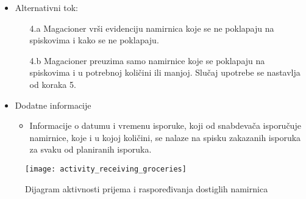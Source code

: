 \begin{itemize}
		\item{Alternativni tok:}
			\begin{enumerate}
				\item[4.a] {Magacioner vrši evidenciju namirnica koje se ne poklapaju na spiskovima i kako se ne poklapaju.} 
				\item[4.b]{Magacioner preuzima samo namirnice koje se poklapaju na spiskovima i u potrebnoj količini ili manjoj. Slučaj upotrebe se nastavlja od koraka 5.}
			\end{enumerate}
		\item{Dodatne informacije}
			\begin{itemize}
				\item{Informacije o datumu i vremenu isporuke, koji od snabdevača isporučuje namirnice, koje i u kojoj količini, se nalaze na spisku zakazanih isporuka za svaku od planiranih isporuka.}
			\end{itemize}
	\end{itemize}
\begin{figure}[H]
	\begin{center}
		\texttt{[image: activity\_receiving\_groceries]}
		\caption{Dijagram aktivnosti prijema i raspoređivanja dostiglih namirnica}
	\end{center}
\end{figure}
